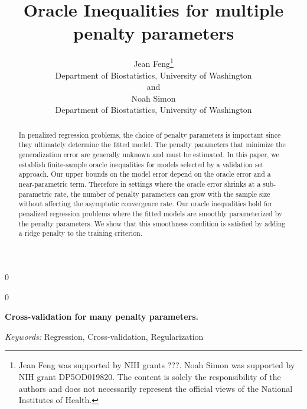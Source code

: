 \documentclass[12pt]{article}
\newcommand{\blind}{0}
\begin{document}
\def\spacingset#1{\renewcommand{\baselinestretch}%
{#1}\small\normalsize} \spacingset{1}



\blind
{
  \title{\bf Oracle Inequalities for multiple penalty parameters}
  \author{Jean Feng\thanks{
    Jean Feng was supported by NIH grants ???. %
    Noah Simon was supported by NIH grant DP5OD019820.
    The content is solely the responsibility of the authors and does not necessarily represent the official views of the National Institutes of Health.}\\
    Department of Biostatistics, University of Washington\\
    and \\
    Noah Simon \\
    Department of Biostatistics, University of Washington}
  \maketitle
} \fi

\blind
{
  \bigskip
  \bigskip
  \bigskip
  \begin{center}
    {\LARGE\bf Cross-validation for many penalty parameters.}
\end{center}
  \medskip
} \fi

\bigskip
\begin{abstract}

In penalized regression problems, the choice of penalty parameters is important since they ultimately determine the fitted model. The penalty parameters that minimize the generalization error are generally unknown and must be estimated. In this paper, we establish finite-sample oracle inequalities for models selected by a validation set approach. Our upper bounds on the model error depend on the oracle error and a near-parametric term. Therefore in settings where the oracle error shrinks at a sub-parametric rate, the number of penalty parameters can grow with the sample size without affecting the asymptotic convergence rate. Our oracle inequalities hold for penalized regression problems where the fitted models are smoothly parameterized by the penalty parameters. We show that this smoothness condition is satisfied by adding a ridge penalty to the training criterion.

\end{abstract}

\noindent%
{\it Keywords:}  Regression, Cross-validation, Regularization
\vfill
\end{document}
